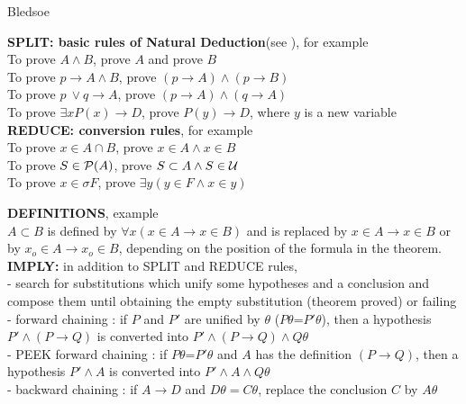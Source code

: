 


\calculusAcronym{\Bledsoe}




\maketitle

\begin{entry}{Bledsoe}  

\begin{calculus}

\textbf {SPLIT: basic rules of Natural Deduction}(see ),
for example\\
To prove $A\land B$, prove $A$ and prove $B$\\
To prove $p \rightarrow  A \land B$, prove $(p \rightarrow A) \land (p \rightarrow B)$\\
To prove $p \ \lor q \rightarrow  A $, prove $(p \rightarrow A) \land (q \rightarrow A)$\\
To prove $\exists x P(x) \rightarrow D$, prove $P(y) \rightarrow D$, where $y$ is a new variable\\
\textbf {REDUCE: conversion rules}, for example\\
To prove $x \in A \cap B$, prove   $x \in A \land x \in B$ \\
To prove $S \in {\cal  P} (A)$, prove $S \subset A \land S \in  {\cal U}$\\
To prove $x \in \sigma F$, prove $\exists y (y \in F \land x \in y)$

\textbf {DEFINITIONS},  example\\
$A \subset B$ is defined by $\forall x(x \in A \rightarrow x \in B)$ and is 
replaced by $x \in A \rightarrow x \in B$ or by 
$x_o \in A \rightarrow x_o \in B$, depending on the position 
of the formula in the theorem.\\
\textbf {IMPLY: }  
in addition to SPLIT and REDUCE rules, \\
- search for substitutions which unify some hypotheses and a conclusion and \\
compose them until obtaining the empty substitution (theorem proved) or failing\\
- forward chaining : if $P$ and $P'$ are unified by $\theta$ ($P \theta$=$P' \theta$), then a hypothesis  
$P' \land (P \rightarrow Q)$ is converted into 
$P' \land (P \rightarrow Q) \land Q \theta$\\
- PEEK forward chaining : if $P\theta$=$P'\theta$ and $A$ has the definition 
$(P \rightarrow Q)$, 
then a hypothesis $P' \land A$ is converted into $P'\land A \land Q \theta$ \\
- backward chaining : if $A \rightarrow D$ and $D \theta = C \theta$, 
replace the conclusion $C$ by $A \theta$
\end{calculus}


\end{entry}
